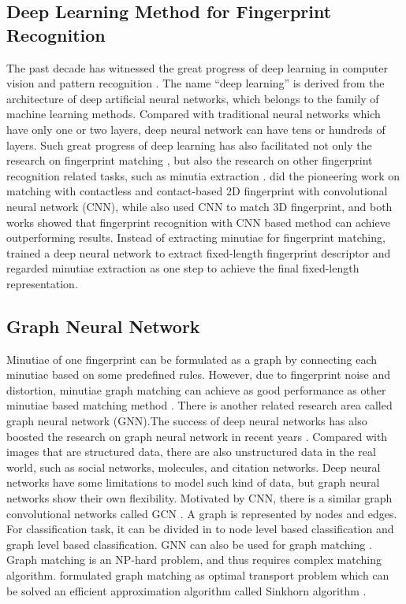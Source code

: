 \subsection{Deep Learning Method for Fingerprint Recognition}
The past decade has witnessed the great progress of deep learning in computer vision and pattern recognition \cite{HeCVPR2016ResNet} \cite{Simonyan2014VGG} \cite{SzegedyCVPR2015InceptionV1}. The name “deep learning” is derived from the architecture of deep artificial neural networks, which belongs to the family of machine learning methods. Compared with traditional neural networks which have only one or two layers, deep neural network can have tens or hundreds of layers. Such great progress of deep learning has also facilitated not only the research on fingerprint matching \cite{CaoTPAMI2018}, but also the research on other fingerprint recognition related tasks, such as minutia extraction \cite{TangIJCB2017} \cite{NguyenICB2018}. \cite{LinTIFS2018} did the pioneering work on matching with contactless and contact-based 2D fingerprint with convolutional neural network (CNN), while \cite{LinPR2018} also used CNN to match 3D fingerprint, and both works showed that fingerprint recognition with CNN based method can achieve outperforming results. Instead of extracting minutiae for fingerprint matching, \cite{EngelsmaTPAMI2019} trained a deep neural network to extract fixed-length fingerprint descriptor and regarded minutiae extraction as one step to achieve the final fixed-length representation.

\subsection{Graph Neural Network}
Minutiae of one fingerprint can be formulated as a graph by connecting each minutiae based on some predefined rules. However, due to fingerprint noise and distortion, minutiae graph matching can achieve as good performance as other minutiae based matching method \cite{ChikkerurICB2006}. There is another related research area called graph neural network (GNN).The success of deep neural networks has also boosted the research on graph neural network  in recent years \cite{WuTNNLS2020} \cite{ZhouAI2020} \cite{XuICLR2019GIN}. Compared with images that are structured data, there are also unstructured data in the real world, such as social networks, molecules, and citation networks. Deep neural networks have some limitations to model such kind of data, but graph neural networks show their own flexibility. Motivated by CNN, there is a similar graph convolutional networks called GCN \cite{KipfICLR2017}. A graph is represented by nodes and edges. For classification task, it can be divided in to node level based classification and graph level based classification. GNN can also be used for graph matching \cite{ZanfirCVPR2018} \cite{LiICML2019}. Graph matching is an NP-hard problem, and thus requires complex matching algorithm. \cite{SarlinCVPR2020superglue} formulated graph matching as optimal transport problem which can be solved an efficient approximation algorithm called Sinkhorn algorithm \cite{CuturiNIPS2013sinkhorn}.